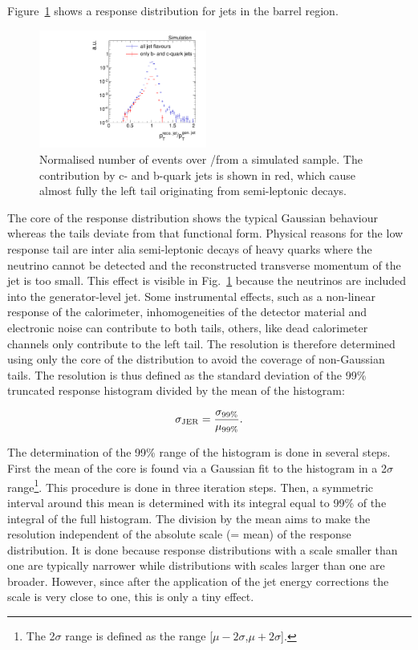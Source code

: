 Figure~\ref{res:fig:TypicalResponse} shows a response distribution for jets in the barrel region.
\begin{figure}[b]
  \centering
      \includegraphics[width=0.49\textwidth]{figures/resolution/generalApproach/intrinsicExampleContributionofBCQuarks.pdf}
  \caption{Normalised number of events over \ptrecojet/\ptgenjet from a simulated \GAMJET sample. 
           The contribution by c- and b-quark jets is shown in red, which cause almost fully the left tail originating from semi-leptonic decays. }  
  \label{res:fig:TypicalResponse}
\end{figure}
The core of the response distribution shows the typical Gaussian behaviour whereas the tails deviate from that functional form.
Physical reasons for the low response tail are inter alia semi-leptonic decays of heavy quarks where the neutrino cannot be detected and the reconstructed transverse momentum of the jet is too small.
This effect is visible in Fig.~\ref{res:fig:TypicalResponse} because the neutrinos are included into the generator-level jet.
Some instrumental effects, such as a non-linear response of the calorimeter, inhomogeneities of the detector material and electronic noise can contribute to both tails, 
others, like dead calorimeter channels only contribute to the left tail. 
The resolution is therefore determined using only the core of the distribution to avoid the coverage of non-Gaussian tails.
The resolution is thus defined as the standard deviation of the 99\% truncated response histogram divided by the mean of the histogram:

\begin{equation*}\label{res:eq:resolutionFormula}
\sigma_\mathrm{JER} = \frac{\sigma_{99\%}}{\mu_{99\%}}.
\end{equation*}

The determination of the 99\% range of the histogram is done in several steps. 
First the mean of the core is found via a Gaussian fit to the histogram in a 2$\sigma$ range\footnote{The 2$\sigma$ range is defined as the range [$\mu - 2\sigma$,$\mu + 2\sigma$].}. 
This procedure is done in three iteration steps.
Then, a symmetric interval around this mean is determined with its integral equal to 99\% of the integral of the full histogram. 
The division by the mean aims to make the resolution independent of the absolute scale (= mean) of the response distribution.
It is done because response distributions with a scale smaller than one are typically narrower while distributions with scales larger than one are broader.
However, since after the application of the jet energy corrections the scale is very close to one, this is only a tiny effect.

